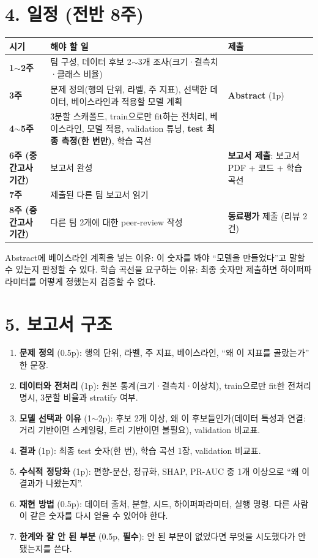 \documentclass[12pt]{article}
\begin{document}
\section*{4. 일정 (전반 8주)}
\begin{center}
\small
\begin{tabular}{@{}p{3.6cm}p{5.4cm}p{3.7cm}@{}}
\toprule
\textbf{시기} & \textbf{해야 할 일} & \textbf{제출} \\
\midrule
\textbf{1$\sim$2주} & 팀 구성, 데이터 후보 2$\sim$3개 조사(크기·결측치·클래스 비율) &  \\
\textbf{3주} & 문제 정의(행의 단위, 라벨, 주 지표), 선택한 데이터, 베이스라인과 적용할 모델 계획 & \textbf{Abstract} (1p) \\
\textbf{4$\sim$5주} & 3분할 스캐폴드, train으로만 fit하는 전처리, 베이스라인, 모델 적용, validation 튜닝, \textbf{test 최종 측정(한 번만)}, 학습 곡선 &  \\
\textbf{6주 (중간고사 기간)} & 보고서 완성 & \textbf{보고서 제출}: 보고서 PDF + 코드 + 학습 곡선 \\
\textbf{7주} & 제출된 다른 팀 보고서 읽기 &  \\
\textbf{8주 (중간고사 기간)} & 다른 팀 2개에 대한 peer-review 작성 & \textbf{동료평가} 제출 (리뷰 2건) \\
\bottomrule
\end{tabular}
\end{center}
\vspace{4pt}
Abstract에 베이스라인 계획을 넣는 이유: 이 숫자를 봐야 ``모델을
만들었다''고 말할 수 있는지 판정할 수 있다. 학습 곡선을 요구하는 이유:
최종 숫자만 제출하면 하이퍼파라미터를 어떻게 정했는지 검증할 수 없다.

\section*{5. 보고서 구조}
\begin{enumerate}
\item \textbf{문제 정의} (0.5p): 행의 단위, 라벨, 주 지표,
  베이스라인, ``왜 이 지표를 골랐는가'' 한 문장.
\item \textbf{데이터와 전처리} (1p): 원본 통계(크기·결측치·이상치),
  train으로만 fit한 전처리 명시, 3분할 비율과 stratify 여부.
\item \textbf{모델 선택과 이유} (1$\sim$2p): 후보 2개 이상, 왜 이
  후보들인가(데이터 특성과 연결: 거리 기반이면 스케일링, 트리
  기반이면 불필요), validation 비교표.
\item \textbf{결과} (1p): 최종 test 숫자(한 번), 학습 곡선 1장,
  validation 비교표.
\item \textbf{수식적 정당화} (1p): 편향-분산, 정규화, SHAP, PR-AUC
  중 1개 이상으로 ``왜 이 결과가 나왔는지''.
\item \textbf{재현 방법} (0.5p): 데이터 출처, 분할, 시드, 하이퍼파라미터, 실행 명령. 다른 사람이 같은 숫자를 다시 얻을 수 있어야 한다.
\item \textbf{한계와 잘 안 된 부분} (0.5p, \textbf{필수}): 안
  된 부분이 없었다면 무엇을 시도했다가 안 됐는지를 쓴다.
\end{enumerate}
\end{document}
